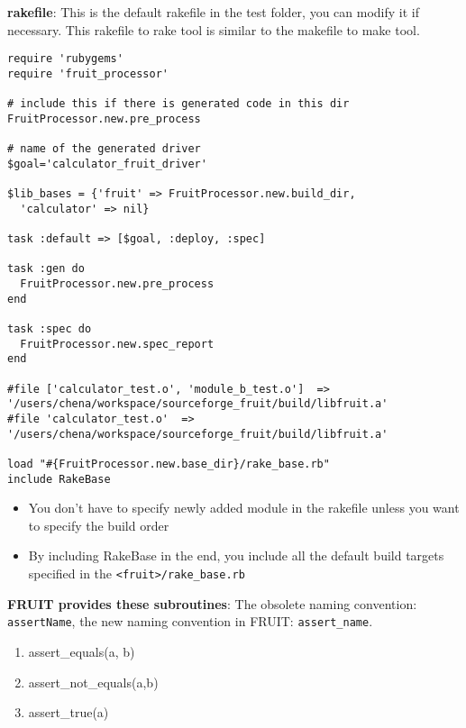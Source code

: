 

{\bf rakefile}: This is the default rakefile in the test folder, you
can modify it if necessary. This rakefile to rake tool is similar to
the makefile to make tool.
\begin{verbatim}
require 'rubygems'
require 'fruit_processor'
 
# include this if there is generated code in this dir
FruitProcessor.new.pre_process
 
# name of the generated driver
$goal='calculator_fruit_driver'
 
$lib_bases = {'fruit' => FruitProcessor.new.build_dir,
  'calculator' => nil}
 
task :default => [$goal, :deploy, :spec]
 
task :gen do
  FruitProcessor.new.pre_process
end
 
task :spec do
  FruitProcessor.new.spec_report
end
 
#file ['calculator_test.o', 'module_b_test.o']  => '/users/chena/workspace/sourceforge_fruit/build/libfruit.a'
#file 'calculator_test.o'  => '/users/chena/workspace/sourceforge_fruit/build/libfruit.a'
 
load "#{FruitProcessor.new.base_dir}/rake_base.rb"
include RakeBase
\end{verbatim}
\begin{itemize}
\item You don't have to specify newly added module in the rakefile
  unless you want to specify the build order
\item By including RakeBase in the end, you include all the default
  build targets specified in the \verb!<fruit>/rake_base.rb!
\end{itemize} 

{\bf FRUIT provides these subroutines}: The obsolete naming
convention: \verb!assertName!, the new naming convention in FRUIT:
\verb!assert_name!.
\begin{enumerate}
\item assert\_equals(a, b)
\item assert\_not\_equals(a,b)
\item assert\_true(a)
\end{enumerate}

